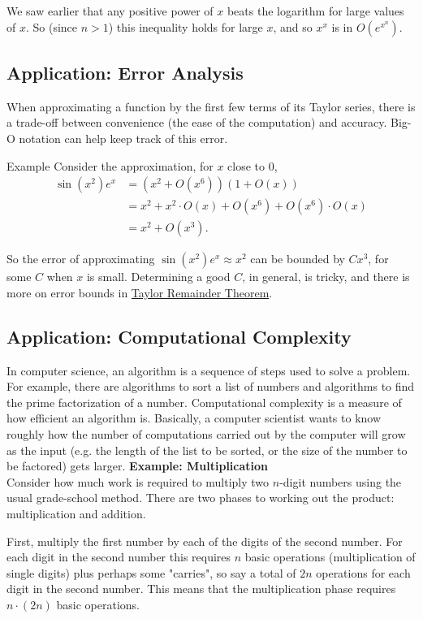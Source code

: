 \documentclass[a4paper]{book}
\begin{document}
\begin{sloppypar}
\begin{examplebox}
We saw earlier that any positive power of $x$ beats the logarithm for large values of $x$. So (since $n >1$) this inequality holds for large $x$, and so $x^x$ is in $O(e^{x^n})$.
\end{examplebox}

\subsection{Application: Error Analysis}
When approximating a function by the first few terms of its Taylor series, there is a trade-off between convenience (the ease of the computation) and accuracy. Big-O notation can help keep track of this error.

Example Consider the approximation, for $x$ close to 0,
\begin{align*}
\sin(x^2)e^x &= \left(x^2 + O(x^6)\right)(1 + O(x)) \\
& = x^2 + x^2 \cdot O(x) + O(x^6) + O(x^6)\cdot O(x) \\
& = x^2 + O(x^3). 
\end{align*}

So the error of approximating $\sin(x^2)e^x \approx x^2$ can be bounded by $Cx^3$, for some $C$ when $x$ is small. Determining a good $C$, in general, is tricky, and there is more on error bounds in \hyperref[ChTaylorRemainderTheorem]{Taylor Remainder Theorem}.

\subsection{Application: Computational Complexity}
In computer science, an algorithm is a sequence of steps used to solve a problem. For example, there are algorithms to sort a list of numbers and algorithms to find the prime factorization of a number. Computational complexity is a measure of how efficient an algorithm is. Basically, a computer scientist wants to know roughly how the number of computations carried out by the computer will grow as the input (e.g. the length of the list to be sorted, or the size of the number to be factored) gets larger.
\bigbreak
\noindent \textbf{Example: Multiplication}\\

Consider how much work is required to multiply two $n$-digit numbers using the usual grade-school method. There are two phases to working out the product: multiplication and addition.

First, multiply the first number by each of the digits of the second number. For each digit in the second number this requires $n$ basic operations (multiplication of single digits) plus perhaps some "carries", so say a total of $2n$ operations for each digit in the second number. This means that the multiplication phase requires $n \cdot (2n)$ basic operations.


\end{sloppypar}
\end{document}

